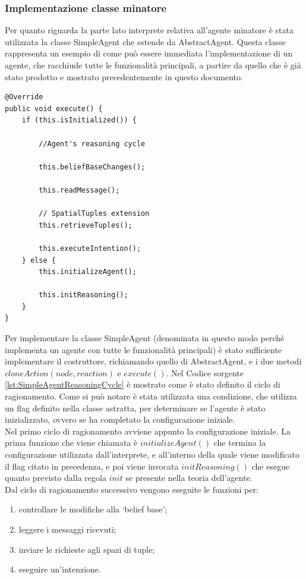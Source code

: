 \subsubsection{Implementazione classe minatore}
Per quanto riguarda la parte lato interprete relativa all'agente minatore è stata utilizzata la classe SimpleAgent che estende da AbstractAgent. Questa classe rappresenta un esempio di come può essere immediata l'implementazione di un agente, che racchiude tutte le funzionalità principali, a partire da quello che è già stato prodotto e mostrato precedentemente in questo documento.
\medskip
\begin{lstlisting}[firstnumber=1,label={lst:SimpleAgentReasoningCycle},caption={Ciclo di ragionamento per l'agente completo}]
@Override
public void execute() {
    if (this.isInitialized()) {

        //Agent's reasoning cycle

        this.beliefBaseChanges();

        this.readMessage();

        // SpatialTuples extension
        this.retrieveTuples();

        this.executeIntention();
    } else {
        this.initializeAgent();

        this.initReasoning();
    }
}
\end{lstlisting}
Per implementare la classe SimpleAgent (denominata in questo modo perchè implementa un agente con tutte le funzionalità principali) è stato sufficiente implementare il costruttore, richiamando quello di AbstractAgent, e i due metodi $cloneAction(node, reaction)$ e $execute()$.
Nel Codice sorgente \ref{lst:SimpleAgentReasoningCycle} è mostrato come è stato definito il ciclo di ragionamento.
Come si può notare è stata utilizzata una condizione, che utilizza un flag definito nella classe astratta, per determinare se l'agente è stato inizializzato, ovvero se ha completato la configurazione iniziale.
\\
Nel primo ciclo di ragionamento avviene appunto la configurazione iniziale. La prima funzione che viene chiamata è $initializeAgent()$ che termina la configurazione utilizzata dall'interprete, e all'interno della quale viene modificato il flag citato in precedenza, e poi viene invocata $initReasoning()$ che esegue quanto previsto dalla regola $init$ se presente nella teoria dell'agente.
\\
Dal ciclo di ragionamento successivo vengono eseguite le funzioni per:
\begin{enumerate}
\item controllare le modifiche alla `belief base';
\item leggere i messaggi ricevuti;
\item inviare le richieste agli spazi di tuple;
\item eseguire un'intenzione.
\end{enumerate}
